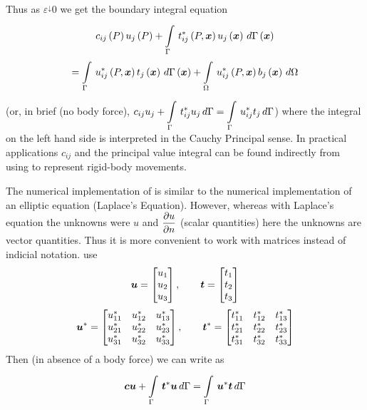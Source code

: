 Thus as $\varepsilon^{\downarrow}0$ we get the boundary integral equation
\begin{multline}
  \fnof{c_{ij}}{P} \fnof{u_{j}}{P} +
  \gint{\Gamma}{}{\fnof{t_{ij}^{*}}{P,\vect{x}}
    \fnof{u_{j}}{\vect{x}}}{\fnof{\Gamma}{\vect{x}}} \\
  = \gint{\Gamma}{}{\fnof{u_{ij}^{*}}{P,\vect{x}}
    \fnof{t_{j}}{\vect{x}}}{\fnof{\Gamma}{\vect{x}}} 
  + \goneint{\fnof{u_{ij}^{*}}{P,\vect{x}} \fnof{b_{j}}{\vect{x}}}{\Omega}
  \label{eqn:eqnH}
\end{multline}
(or, in brief (no body force), $c_{ij} u_{j} +   \displaystyle\int\limits_{\Gamma}^{} \,t_{ij}^{*}
u_{j}\,d\Gamma  =   \displaystyle\int\limits_{\Gamma}^{} \,u_{ij}^{*} t_{j}\,d\Gamma  $) where the
integral on the left hand side is interpreted in the Cauchy Principal sense.
In practical applications $c_{ij}$ and the principal value integral can be
found indirectly from using  to represent rigid-body
movements.

The numerical implementation of  is similar to the numerical 
implementation of an elliptic equation (\eg Laplace's Equation).  However, whereas
with Laplace's equation the unknowns were $u$ and $ \dfrac{\partial u}{\partial n} $ (scalar 
quantities) here the unknowns are vector quantities. Thus it is more 
convenient to work with matrices instead of indicial notation.
\newline \ie use
\begin{displaymath}
  \vect{u} = \begin{bmatrix}
    u_{1} \\
    u_{2} \\
    u_{3}
  \end{bmatrix}, \qquad 
  \vect{t} = \begin{bmatrix}
    t_{1} \\ 
    t_{2} \\
    t_{3}
  \end{bmatrix}
\end{displaymath}
\begin{displaymath}
  \vect{u}^{*} = \begin{bmatrix}
    u_{11}^{*} &  u_{12}^{*} &  u_{13}^{*}\\
    u_{21}^{*} &  u_{22}^{*} &  u_{23}^{*}\\
    u_{31}^{*} &  u_{32}^{*} &  u_{33}^{*}
  \end{bmatrix}, \qquad
  \vect{t}^{*} = \begin{bmatrix}
    t_{11}^{*} &  t_{12}^{*} &  t_{13}^{*}\\
    t_{21}^{*} &  t_{22}^{*} &  t_{23}^{*}\\
    t_{31}^{*} &  t_{32}^{*} &  t_{33}^{*}
  \end{bmatrix}
\end{displaymath}
Then (in absence of a body force) we can write  as 
\begin{equation}
  \vect{cu} + \goneint{\vect{t}^{*}\vect{u}}{\Gamma} =
  \goneint{\vect{u}^{*}\vect{t}}{\Gamma}
  \label{eqn:eqnH*}
\end{equation}

